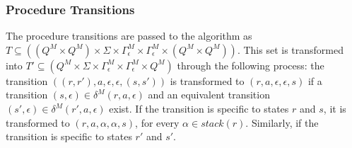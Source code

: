         \subsubsection*{Procedure Transitions}
            The procedure transitions are passed to the algorithm as $T \subseteq ((Q^M\times Q^M) \times \Sigma \times \Gamma^M_\epsilon \times \Gamma^M_\epsilon \times (Q^M\times Q^M))$. This set is transformed into $T' \subseteq (Q^M \times \Sigma \times \Gamma^M_\epsilon \times \Gamma^M_\epsilon \times Q^M)$ through the following process: the transition $((r, r'), a, \epsilon, \epsilon, (s, s'))$ is transformed to $(r, a, \epsilon, \epsilon, s)$ if a transition $(s, \epsilon) \in \delta^M(r, a, \epsilon)$ and an equivalent transition $(s', \epsilon) \in \delta^M(r', a, \epsilon)$ exist. If the transition is specific to states $r$ and $s$, it is transformed to $(r, a, \alpha, \alpha, s)$, for every $\alpha \in stack(r)$. Similarly, if the transition is specific to states $r'$ and $s'$.


